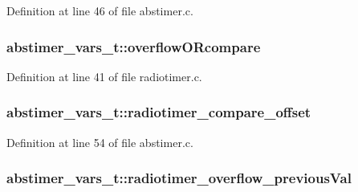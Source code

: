 Definition at line 46 of file abstimer.\+c.

\subsubsection[{\texorpdfstring{overflow\+O\+Rcompare}{overflowORcompare}}]{ abstimer\+\_\+vars\+\_\+t\+::overflow\+O\+Rcompare}\hypertarget{structabstimer__vars__t_a84d82332ec6c22add31f5f5a920df8ad}{}\label{structabstimer__vars__t_a84d82332ec6c22add31f5f5a920df8ad}


Definition at line 41 of file radiotimer.\+c.

\subsubsection[{\texorpdfstring{radiotimer\+\_\+compare\+\_\+offset}{radiotimer_compare_offset}}]{ abstimer\+\_\+vars\+\_\+t\+::radiotimer\+\_\+compare\+\_\+offset}\hypertarget{structabstimer__vars__t_a563f76da43061c7122674e6d9c400566}{}\label{structabstimer__vars__t_a563f76da43061c7122674e6d9c400566}


Definition at line 54 of file abstimer.\+c.

\subsubsection[{\texorpdfstring{radiotimer\+\_\+overflow\+\_\+previous\+Val}{radiotimer_overflow_previousVal}}]{ abstimer\+\_\+vars\+\_\+t\+::radiotimer\+\_\+overflow\+\_\+previous\+Val}\hypertarget{structabstimer__vars__t_a2f1bc141ad08276cd8fde19c2e2f301d}{}\label{structabstimer__vars__t_a2f1bc141ad08276cd8fde19c2e2f301d}


